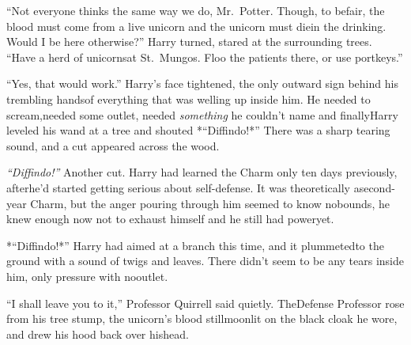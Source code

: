 ``Not everyone thinks the same way we do, Mr.~Potter. Though, to befair, the blood must come from a live unicorn and the unicorn must diein the drinking. Would I be here otherwise?''
Harry turned, stared at the surrounding trees. ``Have a herd of unicornsat St.~Mungos. Floo the patients there, or use portkeys.''

``Yes, that would work.''
Harry's face tightened, the only outward sign behind his trembling handsof everything that was welling up inside him. He needed to scream,needed some outlet, needed \emph{something} he couldn't name and finallyHarry leveled his wand at a tree and shouted *``Diffindo!*''
There was a sharp tearing sound, and a cut appeared across the wood.

\emph{``Diffindo!''}
Another cut. Harry had learned the Charm only ten days previously, afterhe'd started getting serious about self-defense. It was theoretically asecond-year Charm, but the anger pouring through him seemed to know nobounds, he knew enough now not to exhaust himself and he still had poweryet.

*``Diffindo!*'' Harry had aimed at a branch this time, and it plummetedto the ground with a sound of twigs and leaves.
There didn't seem to be any tears inside him, only pressure with nooutlet.

``I shall leave you to it,'' Professor Quirrell said quietly. TheDefense Professor rose from his tree stump, the unicorn's blood stillmoonlit on the black cloak he wore, and drew his hood back over hishead.